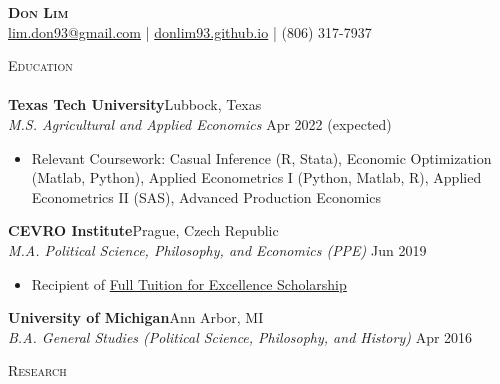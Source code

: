 \documentclass[a4paper]{article}
\newcommand{\lineunder} {
    \vspace*{-8pt} \\
    \hspace*{-18pt} \hrulefill \\
}
\newcommand{\header} [1] {
    {\hspace*{-18pt}\vspace*{6pt} \textsc{\large{#1}}}
    \vspace*{-6pt} \lineunder
}
\begin{document}
\vspace*{-40pt}

    

\vspace*{-10pt}
\begin{center}
	{\Huge \scshape \textbf{{Don Lim}}}\\
	\href{mailto:lim.don93@gmail.com}{lim.don93@gmail.com} | \href{https://donlim93.github.io/}{donlim93.github.io} | (806) 317-7937\\
\end{center}

\header{Education}
\vspace{1mm}
\textbf{Texas Tech University}\hfill Lubbock, Texas\\
\textit{M.S. Agricultural and Applied Economics} \hfill Apr 2022 (expected)\\
\begin{itemize}[noitemsep,nolistsep]
	\item Relevant Coursework: Casual Inference (R, Stata), Economic Optimization (Matlab, Python), Applied Econometrics I (Python, Matlab, R), Applied Econometrics II (SAS), Advanced Production Economics
\end{itemize}
\vspace{1mm}
\textbf{CEVRO Institute}\hfill Prague, Czech Republic\\
\textit{M.A. Political Science, Philosophy, and Economics (PPE)} \hfill Jun 2019\\
\begin{itemize}[noitemsep,nolistsep]
	\item Recipient of \href{http://www.cevroinstitut.cz/en/article/scholarships/}{Full Tuition for Excellence Scholarship}
\end{itemize}
\vspace{1mm}
\textbf{University of Michigan}\hfill Ann Arbor, MI\\
\textit{B.A. General Studies (Political Science, Philosophy, and History)} \hfill Apr 2016\\
\vspace{2mm}

\header{Research}
\vspace{1mm}
\end{document}
